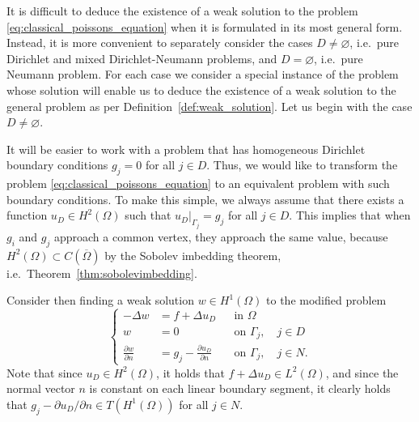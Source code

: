 \documentclass[english, 12pt, a4paper, sci, utf8, a-2b, online]{aaltothesis}
\theoremstyle{definition}
\theoremstyle{plain}
\numberwithin{equation}{section}
\begin{document}
It is difficult to deduce the existence of a weak solution to the problem
\eqref{eq:classical_poissons_equation} when it is formulated in its most
general form. Instead, it is more convenient
to separately consider the cases $D \neq \varnothing$,
i.e.\ pure Dirichlet and mixed Dirichlet-Neumann problems, and
$D = \varnothing$, i.e.\ pure Neumann problem.
For each case we consider a special instance of the problem whose
solution will enable us to deduce the existence of a weak solution
to the general problem as per Definition~\ref{def:weak_solution}.
Let us begin with the case $D \neq \varnothing$.

It will be easier to work with
a problem that has homogeneous Dirichlet boundary conditions
$g_j = 0$ for all $j \in D$.
Thus, we would like to transform the problem \eqref{eq:classical_poissons_equation}
to an equivalent problem with such boundary conditions.
To make this simple, we always assume that there exists a function
$u_D \in H^2(\Omega)$ such that $u_D|_{\Gamma_j} = g_j$ for all $j \in D$.
This implies that when $g_i$ and $g_j$ approach a common vertex,
they approach the same value, because
$H^2(\Omega) \subset C(\overline{\Omega})$
by the Sobolev imbedding theorem, i.e.\ Theorem~\ref{thm:sobolevimbedding}.

Consider then finding a weak solution $w \in H^1(\Omega)$ to the modified problem
\begin{equation}
    \label{eq:poissons_equation_modified}
    \left\{
        \begin{aligned}
            -\Delta w &= f + \Delta u_D && \text{in } \Omega \\
            w &= 0 && \text{on } \Gamma_j, \quad j \in D \\
            \frac{\partial w}{\partial n} &=
                g_j - \frac{\partial u_D}{\partial n} && \text{on } \Gamma_j,
                \quad j \in N.
        \end{aligned}
    \right.
\end{equation}
Note that since $u_D \in H^2(\Omega)$, it holds that
$f + \Delta u_D \in L^2(\Omega)$, and since the normal vector $n$
is constant on each linear boundary segment, it clearly holds that
$g_j - \partial u_D / \partial n \in T(H^1(\Omega))$ for all $j \in N$.
\end{document}

